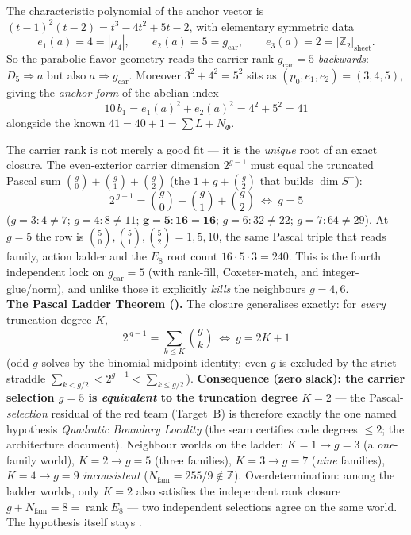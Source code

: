 \documentclass[11pt,a4paper]{article}
\newcommand{\gcar}{g_{\mathrm{car}}}
\newcommand{\Z}{\mathbb{Z}}
\theoremstyle{definition}
\begin{document}
\begin{winbox}
The characteristic polynomial of the anchor vector is $(t-1)^2(t-2)=t^3-4t^2+5t-2$, with elementary
symmetric data
\[
  e_1(a)=4=|\mu_4|,\qquad e_2(a)=5=\gcar,\qquad e_3(a)=2=|\Z_2|_{\mathrm{sheet}} .
\]
So the parabolic flavor geometry reads the carrier rank $\gcar=5$ \emph{backwards}: $D_5\Rightarrow a$ but
also $a\Rightarrow\gcar$. Moreover $3^2+4^2=5^2$ sits as $(p_0,e_1,e_2)=(3,4,5)$, giving the
\emph{anchor form} of the abelian index
\[
  \boxed{\ 10\,b_1=e_1(a)^2+e_2(a)^2=4^2+5^2=41\ }
\]
alongside the known $41=40+1=\sum L+N_\Phi$. \mE
\end{winbox}

\begin{keybox}[Pascal closure: $\gcar=5$ is the unique solution (kills alternatives) \mE]
The carrier rank is not merely a good fit --- it is the \emph{unique} root of an exact closure. The
even-exterior carrier dimension $2^{g-1}$ must equal the truncated Pascal sum $\binom g0+\binom g1+\binom g2$
(the $1{+}g{+}\binom g2$ that builds $\dim S^+$):
\[
  \boxed{\ 2^{\,g-1}=\binom g0+\binom g1+\binom g2\ \Longleftrightarrow\ g=5\ }
\]
($g{=}3:4{\ne}7$; $g{=}4:8{\ne}11$; $\mathbf{g{=}5:16{=}16}$; $g{=}6:32{\ne}22$; $g{=}7:64{\ne}29$). At
$g=5$ the row is $\binom50,\binom51,\binom52=1,5,10$, the same Pascal triple that reads family, action
ladder and the $E_8$ root count $16\cdot5\cdot3=240$. This is the fourth independent lock on $\gcar=5$
(with rank-fill, Coxeter-match, and integer-glue/norm), and unlike those it explicitly \emph{kills} the
neighbours $g=4,6$.
\smallskip\\
\noindent\textbf{The Pascal Ladder Theorem ().} The closure generalises
exactly: for \emph{every} truncation degree $K$,
\[
  \boxed{\ 2^{\,g-1}=\textstyle\sum_{k\le K}\binom gk\ \Longleftrightarrow\ g=2K+1\ }
\]
(odd $g$ solves by the binomial midpoint identity; even $g$ is excluded by the strict straddle
$\sum_{k<g/2}<2^{g-1}<\sum_{k\le g/2}$). \textbf{Consequence (zero slack): the carrier selection $g=5$ is
\emph{equivalent} to the truncation degree $K=2$} --- the Pascal-\emph{selection} residual of the red team
(Target~B) is therefore exactly the one named hypothesis \emph{Quadratic Boundary Locality} (the seam
certifies code degrees $\le2$; the architecture document). Neighbour worlds on the ladder: $K{=}1\to g{=}3$ (a
\emph{one}-family world), $K{=}2\to g{=}5$ (three families), $K{=}3\to g{=}7$ (\emph{nine} families),
$K{=}4\to g{=}9$ \emph{inconsistent} ($N_{\mathrm{fam}}=255/9\notin\Z$). Overdetermination: among the
ladder worlds, only $K=2$ also satisfies the independent rank closure $g+N_{\mathrm{fam}}=8=\operatorname{rank}E_8$
--- two independent selections agree on the same world. The hypothesis itself stays \mC.
\end{keybox}
\end{document}

